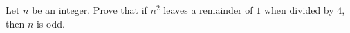 Let $n$ be an integer. Prove that if $n^2$ leaves a remainder of $1$ when divided by $4$, then $n$ is odd.
